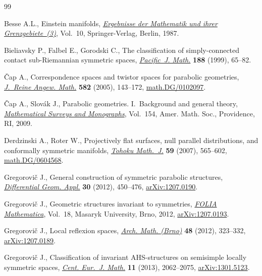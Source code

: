 \begin{thebibliography}{99}
\footnotesize\itemsep=0pt

Besse A.L., Einstein manifolds, \href{https://doi.org/10.1007/978-3-540-74311-8}{\textit{Ergebnisse der Mathematik und ihrer
 Grenzgebiete~(3)}}, Vol.~10, Springer-Verlag, Berlin, 1987.

Bieliavsky P., Falbel E., Gorodski C., The classif\/ication of simply-connected
 contact sub-{R}iemannian symmetric spaces, \href{https://doi.org/10.2140/pjm.1999.188.65}{\textit{Pacific~J. Math.}}
 \textbf{188} (1999), 65--82.

\v{C}ap A., Correspondence spaces and twistor spaces for parabolic geometries,
 \href{https://doi.org/10.1515/crll.2005.2005.582.143}{\textit{J.~Reine Angew. Math.}} \textbf{582} (2005), 143--172,
 \href{http://arxiv.org/abs/math.DG/0102097}{math.DG/0102097}.

\v{C}ap A., Slov\'ak J., Parabolic geometries. {I}.~Background and general
 theory, \href{https://doi.org/10.1090/surv/154}{\textit{Mathematical Surveys and Monographs}}, Vol.~154, Amer. Math.
 Soc., Providence, RI, 2009.

Derdzinski A., Roter W., Projectively f\/lat surfaces, null parallel
 distributions, and conformally symmetric manifolds, \href{https://doi.org/10.2748/tmj/1199649875}{\textit{Tohoku Math.~J.}}
 \textbf{59} (2007), 565--602, \href{http://arxiv.org/abs/math.DG/0604568}{math.DG/0604568}.

Gregorovi\v{c} J., General construction of symmetric parabolic structures,
 \href{https://doi.org/10.1016/j.difgeo.2012.06.006}{\textit{Differential Geom. Appl.}} \textbf{30} (2012), 450--476,
 \href{http://arxiv.org/abs/1207.0190}{arXiv:1207.0190}.

Gregorovi\v{c} J., Geometric structures invariant to symmetries, \href{https://doi.org/10.5817/CZ.MUNI.M210-6010-2012}{\textit{FOLIA
 Mathematica}}, Vol.~18, Masaryk University, Brno, 2012, \href{http://arxiv.org/abs/1207.0193}{arXiv:1207.0193}.

Gregorovi\v{c} J., Local ref\/lexion spaces, \href{https://doi.org/10.5817/AM2012-5-323}{\textit{Arch. Math. (Brno)}}
 \textbf{48} (2012), 323--332, \href{http://arxiv.org/abs/1207.0189}{arXiv:1207.0189}.

Gregorovi\v{c} J., Classif\/ication of invariant {AHS}-structures on semisimple
 locally symmetric spaces, \href{https://doi.org/10.2478/s11533-013-0318-5}{\textit{Cent. Eur.~J. Math.}} \textbf{11} (2013),
 2062--2075, \href{http://arxiv.org/abs/1301.5123}{arXiv:1301.5123}.


\end{thebibliography}
